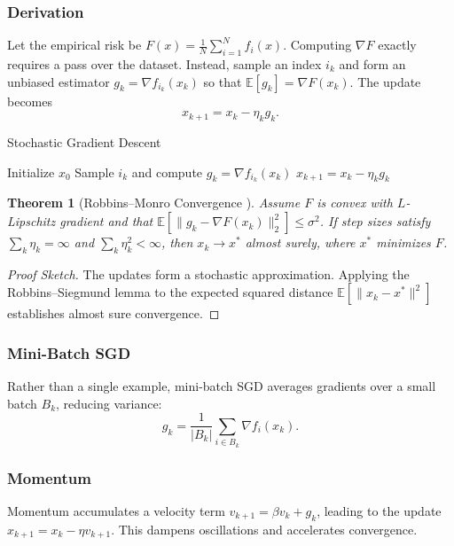 \documentclass[11pt]{book}
\newtheorem{theorem}{Theorem}[chapter]
\begin{document}
\subsubsection{Derivation}
Let the empirical risk be $F(x)=\frac{1}{N}\sum_{i=1}^N f_i(x)$. Computing $\nabla F$ exactly requires a pass over the dataset. Instead, sample an index $i_k$ and form an unbiased estimator $g_k=\nabla f_{i_k}(x_k)$ so that $\mathbb{E}[g_k]=\nabla F(x_k)$. The update becomes
\begin{equation}
x_{k+1}=x_k-\eta_k g_k.
\end{equation}

\begin{algorithm}
\caption{Stochastic Gradient Descent}
\begin{algorithmic}[1]
\STATE Initialize $x_0$
    \STATE Sample $i_k$ and compute $g_k = \nabla f_{i_k}(x_k)$
    \STATE $x_{k+1}=x_k-\eta_k g_k$
\ENDFOR
\end{algorithmic}
\end{algorithm}

\begin{theorem}[Robbins--Monro Convergence \cite{robbins1951}]
Assume $F$ is convex with $L$-Lipschitz gradient and that $\mathbb{E}[\|g_k-\nabla F(x_k)\|_2^2]\le\sigma^2$. If step sizes satisfy $\sum_k \eta_k=\infty$ and $\sum_k \eta_k^2<\infty$, then $x_k\to x^*$ almost surely, where $x^*$ minimizes $F$.
\end{theorem}
\begin{proof}[Proof Sketch]
The updates form a stochastic approximation. Applying the Robbins--Siegmund lemma to the expected squared distance $\mathbb{E}[\|x_k-x^*\|^2]$ establishes almost sure convergence.
\end{proof}

\subsubsection{Mini-Batch SGD}
Rather than a single example, mini-batch SGD averages gradients over a small batch $B_k$, reducing variance:
\begin{equation}
g_k = \frac{1}{|B_k|}\sum_{i\in B_k} \nabla f_i(x_k).
\end{equation}

\subsubsection{Momentum \cite{polyak1964}}
Momentum accumulates a velocity term $v_{k+1}=\beta v_k + g_k$, leading to the update $x_{k+1}=x_k-\eta v_{k+1}$. This dampens oscillations and accelerates convergence.
\end{document}
